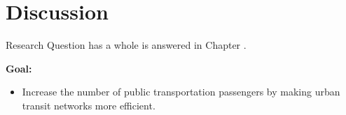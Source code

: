 \section{Discussion}

Research Question \label{itm:1} has a whole is answered in Chapter \label{relatedWork}.

\textbf{Goal:}
\begin{itemize}
\item  Increase the number of public transportation passengers by making urban transit networks more efficient.
\end{itemize}

